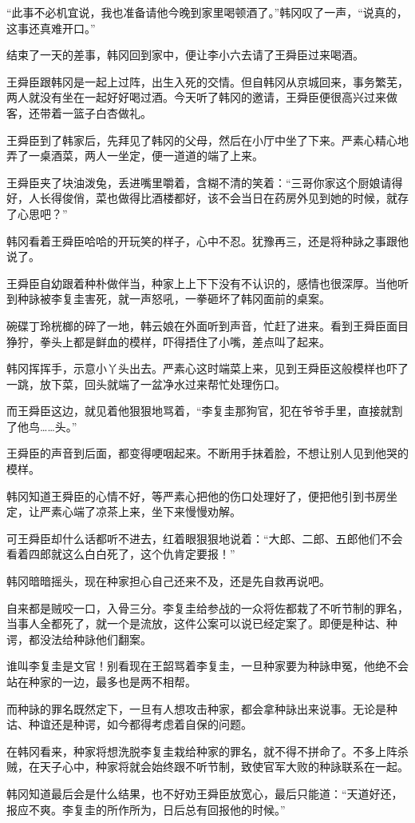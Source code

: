 “此事不必机宜说，我也准备请他今晚到家里喝顿酒了。”韩冈叹了一声，“说真的，这事还真难开口。”

结束了一天的差事，韩冈回到家中，便让李小六去请了王舜臣过来喝酒。

王舜臣跟韩冈是一起上过阵，出生入死的交情。但自韩冈从京城回来，事务繁芜，两人就没有坐在一起好好喝过酒。今天听了韩冈的邀请，王舜臣便很高兴过来做客，还带着一篮子白杏做礼。

王舜臣到了韩家后，先拜见了韩冈的父母，然后在小厅中坐了下来。严素心精心地弄了一桌酒菜，两人一坐定，便一道道的端了上来。

王舜臣夹了块油泼兔，丢进嘴里嚼着，含糊不清的笑着：“三哥你家这个厨娘请得好，人长得俊俏，菜也做得比酒楼都好，该不会当日在药房外见到她的时候，就存了心思吧？”

韩冈看着王舜臣哈哈的开玩笑的样子，心中不忍。犹豫再三，还是将种詠之事跟他说了。

王舜臣自幼跟着种朴做伴当，种家上上下下没有不认识的，感情也很深厚。当他听到种詠被李复圭害死，就一声怒吼，一拳砸坏了韩冈面前的桌案。

碗碟丁玲桄榔的碎了一地，韩云娘在外面听到声音，忙赶了进来。看到王舜臣面目狰狞，拳头上都是鲜血的模样，吓得捂住了小嘴，差点叫了起来。

韩冈挥挥手，示意小丫头出去。严素心这时端菜上来，见到王舜臣这般模样也吓了一跳，放下菜，回头就端了一盆净水过来帮忙处理伤口。

而王舜臣这边，就见着他狠狠地骂着，“李复圭那狗官，犯在爷爷手里，直接就割了他鸟……头。”

王舜臣的声音到后面，都变得哽咽起来。不断用手抹着脸，不想让别人见到他哭的模样。

韩冈知道王舜臣的心情不好，等严素心把他的伤口处理好了，便把他引到书房坐定，让严素心端了凉茶上来，坐下来慢慢劝解。

可王舜臣却什么话都听不进去，红着眼狠狠地说着：“大郎、二郎、五郎他们不会看着四郎就这么白白死了，这个仇肯定要报！”

韩冈暗暗摇头，现在种家担心自己还来不及，还是先自救再说吧。

自来都是贼咬一口，入骨三分。李复圭给参战的一众将佐都栽了不听节制的罪名，当事人全都死了，就一个是流放，这件公案可以说已经定案了。即便是种诂、种谔，都没法给种詠他们翻案。

谁叫李复圭是文官！别看现在王韶骂着李复圭，一旦种家要为种詠申冤，他绝不会站在种家的一边，最多也是两不相帮。

而种詠的罪名既然定下，一旦有人想攻击种家，都会拿种詠出来说事。无论是种诂、种谊还是种谔，如今都得考虑着自保的问题。

在韩冈看来，种家将想洗脱李复圭栽给种家的罪名，就不得不拼命了。不多上阵杀贼，在天子心中，种家将就会始终跟不听节制，致使官军大败的种詠联系在一起。

韩冈知道最后会是什么结果，也不好劝王舜臣放宽心，最后只能道：“天道好还，报应不爽。李复圭的所作所为，日后总有回报他的时候。”

